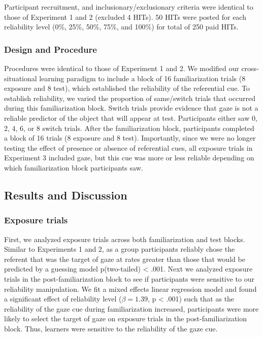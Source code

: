 \documentclass[a4paper,man,natbib]{apa6}
\begin{document}
Participant recruitment, and inclusionary/exclusionary criteria were
identical to those of Experiment 1 and 2 (excluded 4 HITs). 50 HITs were
posted for each reliability level (0\%, 25\%, 50\%, 75\%, and 100\%) for
total of 250 paid HITs.

\subsubsection{Design and Procedure}\label{design-and-procedure-2}

Procedures were identical to those of Experiment 1 and 2. We modified
our cross-situational learning paradigm to include a block of 16
familiarization trials (8 exposure and 8 test), which established the
reliability of the referential cue. To establish reliability, we varied
the proportion of same/switch trials that occurred during this
familiarization block. Switch trials provide evidence that gaze is not a
reliable predictor of the object that will appear at test. Participants
either saw 0, 2, 4, 6, or 8 switch trials. After the familiarization
block, participants completed a block of 16 trials (8 exposure and 8
test). Importantly, since we were no longer testing the effect of
presence or absence of referential cues, all exposure trials in
Experiment 3 included gaze, but this cue was more or less reliable
depending on which familiarization block participants saw.

\subsection{Results and Discussion}\label{results-and-discussion-2}

\subsubsection{Exposure trials}\label{exposure-trials-2}

First, we analyzed exposure trials across both familiarization and test
blocks. Similar to Experiments 1 and 2, as a group participants reliably
chose the referent that was the target of gaze at rates greater than
those that would be predicted by a guessing model p(two-tailed)
\textless{} .001. Next we analyzed exposure trials in the
post-familiarization block to see if participants were sensitive to our
reliability manipulation. We fit a mixed effects linear regression model
and found a significant effect of reliability level (\(\beta = 1.39\), p
\textless{} .001) such that as the reliability of the gaze cue during
familiarization increased, participants were more likely to select the
target of gaze on exposure trials in the post-familiarization block.
Thus, learners were sensitive to the reliability of the gaze cue.
\end{document}
